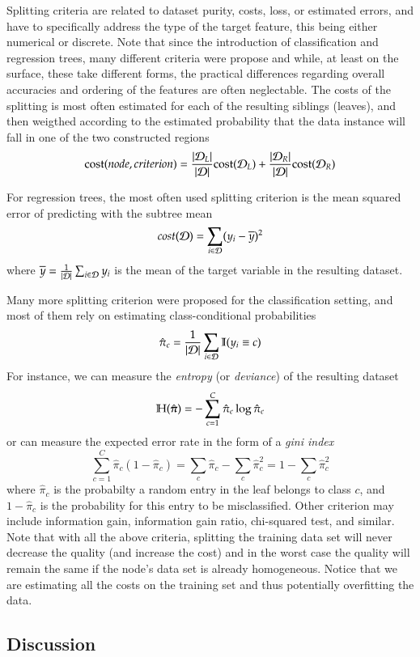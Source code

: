 \begin{refsection}
Splitting criteria are related to dataset purity, costs, loss, or estimated errors, and have to specifically address the type of the target feature, this being either numerical or discrete. Note that since the introduction of classification and regression trees, many different criteria were propose and while, at least on the surface, these take different forms, the practical differences regarding overall accuracies and ordering of the features are often neglectable. The costs of the splitting is most often estimated for each of the resulting siblings (leaves), and then weigthed according to the estimated probability that the data instance will fall in one of the two constructed regions
$$ {\rm cost}(node, criterion) = {|\mathcal{D}_L|\over |\mathcal{D}|}{\rm cost}(\mathcal{D}_L) + {|\mathcal{D}_R|\over |\mathcal{D}|}{\rm cost}(\mathcal{D}_R) $$

For regression trees, the most often used splitting criterion is the mean squared error of predicting with the subtree mean
$$ cost(\mathcal{D}) = \sum_{i\in\mathcal{D}}(y_i-\overline{y})^2 $$
where $\overline{y} = {1\over|\mathcal{D}|}\sum_{i\in\mathcal{D}}y_i$ is the mean of the target variable in the resulting dataset.

Many more splitting criterion were proposed for the classification setting, and most of them rely on estimating class-conditional probabilities
$$ \hat{\pi}_c = {1\over|\mathcal{D}|}\sum_{i\in\mathcal{D}}\mathbb{I}(y_i\equiv c) $$
For instance, we can measure the {\em entropy} (or {\em deviance}) of the resulting dataset
$$ \mathbb{H}(\hat{\boldsymbol{\pi}}) = -\sum_{c=1}^C \hat{\pi}_c \log \hat{\pi}_c $$
or can measure the expected error rate in the form of a {\em gini index}
$$ \sum_{c=1}^C \hat{\pi}_c (1-\hat{\pi}_c) = \sum_c \hat{\pi}_c - \sum_c \hat{\pi}_c^2 = 1 - \sum_c \hat{\pi}_c^2 $$
where $\hat{\pi}_c$ is the probabilty a random entry in the leaf belongs to class $c$, and $1-\hat{\pi}_c$ is the probability for this entry to be misclassified. Other criterion may include information gain, information gain ratio, chi-squared test, and similar. Note that with all the above criteria, splitting the training data set will never decrease the quality (and increase the cost) and in the worst case the quality will remain the same if the node's data set is already homogeneous. Notice that we are estimating all the costs on the training set and thus potentially overfitting the data.

\subsection*{Discussion}


\end{refsection}
